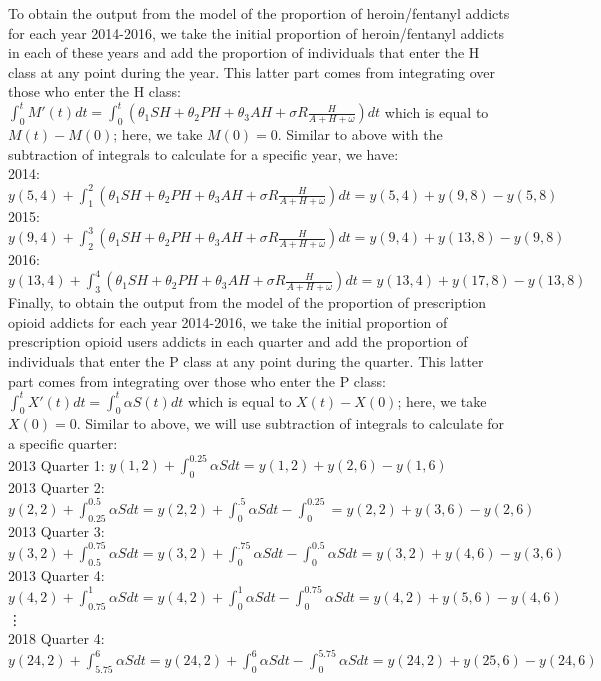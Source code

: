 \documentclass[12pt]{article}
\begin{document}
To obtain the output from the model of the proportion of heroin/fentanyl addicts for each year 2014-2016, we take the initial proportion of heroin/fentanyl addicts in each of these years and add the proportion of individuals that enter the H class at any point during the year. This latter part comes from integrating over those who enter the H class: $\int_0^t M'(t)dt=\int_0^t (\theta_1 SH+\theta_2 PH+\theta_3 AH +\sigma R \frac{H}{A+H+\omega})dt$ which is equal to $M(t)-M(0)$; here, we take $M(0)=0.$ Similar to above with the subtraction of integrals to calculate for a specific year, we have: \\
 2014: $y(5,4)+\int_1^2  (\theta_1 SH+\theta_2 PH+\theta_3 AH +\sigma R \frac{H}{A+H+\omega}) dt= y(5,4)+y(9,8)-y(5,8)$ \\
 2015: $y(9,4)+\int_2^3  (\theta_1 SH+\theta_2 PH+\theta_3 AH +\sigma R \frac{H}{A+H+\omega}) dt= y(9,4)+y(13,8)-y(9,8)$ \\
 2016: $y(13,4)+\int_3^4  (\theta_1 SH+\theta_2 PH+\theta_3 AH +\sigma R \frac{H}{A+H+\omega}) dt= y(13,4)+y(17,8)-y(13,8)$ \\




Finally, to obtain the output from the model of the proportion of prescription opioid addicts for each year 2014-2016, we take the initial proportion of prescription opioid users addicts in each quarter and add the proportion of individuals that enter the P class at any point during the quarter. This latter part comes from integrating over those who enter the P class: $\int_0^t X'(t)dt=\int_0^t \alpha S(t)dt$ which is equal to $X(t)-X(0)$; here, we take $X(0)=0.$ Similar to above, we will use subtraction of integrals to calculate for a specific quarter: \\
 2013 Quarter 1: $y(1,2)+\int_0^{0.25} \alpha S dt= y(1,2)+y(2,6)-y(1,6)$ \\
 2013 Quarter 2: $y(2,2)+\int_{0.25}^{0.5} \alpha S dt =y(2,2)+\int_0^{.5} \alpha S dt- \int_0^{0.25} =y(2,2)+y(3,6)-y(2,6)$ \\
 2013 Quarter 3: $y(3,2)+\int_{0.5}^{0.75} \alpha S dt =y(3,2)+\int_0^{.75} \alpha S dt- \int_0^{0.5} \alpha S dt=y(3,2)+y(4,6)-y(3,6)$ \\
  2013 Quarter 4: $y(4,2)+\int_{0.75}^{1} \alpha S dt =y(4,2)+\int_0^{1} \alpha S dt- \int_0^{0.75} \alpha S dt=y(4,2)+y(5,6)-y(4,6)$ \\
 \vdots \\
  2018 Quarter 4: $y(24,2)+\int_{5.75}^{6} \alpha S dt =y(24,2)+\int_0^{6} \alpha S dt- \int_0^{5.75} \alpha S dt=y(24,2)+y(25,6)-y(24,6)$ \\
\end{document}
